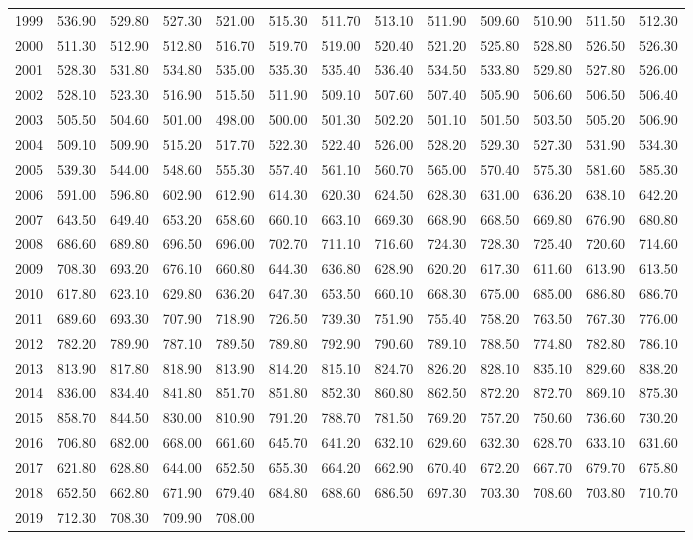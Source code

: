 \begin{longtable}{rrrrrrrrrrrrr}
  1999 & 536.90 & 529.80 & 527.30 & 521.00 & 515.30 & 511.70 & 513.10 & 511.90 & 509.60 & 510.90 & 511.50 & 512.30 \\ 
  2000 & 511.30 & 512.90 & 512.80 & 516.70 & 519.70 & 519.00 & 520.40 & 521.20 & 525.80 & 528.80 & 526.50 & 526.30 \\ 
  2001 & 528.30 & 531.80 & 534.80 & 535.00 & 535.30 & 535.40 & 536.40 & 534.50 & 533.80 & 529.80 & 527.80 & 526.00 \\ 
  2002 & 528.10 & 523.30 & 516.90 & 515.50 & 511.90 & 509.10 & 507.60 & 507.40 & 505.90 & 506.60 & 506.50 & 506.40 \\ 
  2003 & 505.50 & 504.60 & 501.00 & 498.00 & 500.00 & 501.30 & 502.20 & 501.10 & 501.50 & 503.50 & 505.20 & 506.90 \\ 
  2004 & 509.10 & 509.90 & 515.20 & 517.70 & 522.30 & 522.40 & 526.00 & 528.20 & 529.30 & 527.30 & 531.90 & 534.30 \\ 
  2005 & 539.30 & 544.00 & 548.60 & 555.30 & 557.40 & 561.10 & 560.70 & 565.00 & 570.40 & 575.30 & 581.60 & 585.30 \\ 
  2006 & 591.00 & 596.80 & 602.90 & 612.90 & 614.30 & 620.30 & 624.50 & 628.30 & 631.00 & 636.20 & 638.10 & 642.20 \\ 
  2007 & 643.50 & 649.40 & 653.20 & 658.60 & 660.10 & 663.10 & 669.30 & 668.90 & 668.50 & 669.80 & 676.90 & 680.80 \\ 
  2008 & 686.60 & 689.80 & 696.50 & 696.00 & 702.70 & 711.10 & 716.60 & 724.30 & 728.30 & 725.40 & 720.60 & 714.60 \\ 
  2009 & 708.30 & 693.20 & 676.10 & 660.80 & 644.30 & 636.80 & 628.90 & 620.20 & 617.30 & 611.60 & 613.90 & 613.50 \\ 
  2010 & 617.80 & 623.10 & 629.80 & 636.20 & 647.30 & 653.50 & 660.10 & 668.30 & 675.00 & 685.00 & 686.80 & 686.70 \\ 
  2011 & 689.60 & 693.30 & 707.90 & 718.90 & 726.50 & 739.30 & 751.90 & 755.40 & 758.20 & 763.50 & 767.30 & 776.00 \\ 
  2012 & 782.20 & 789.90 & 787.10 & 789.50 & 789.80 & 792.90 & 790.60 & 789.10 & 788.50 & 774.80 & 782.80 & 786.10 \\ 
  2013 & 813.90 & 817.80 & 818.90 & 813.90 & 814.20 & 815.10 & 824.70 & 826.20 & 828.10 & 835.10 & 829.60 & 838.20 \\ 
  2014 & 836.00 & 834.40 & 841.80 & 851.70 & 851.80 & 852.30 & 860.80 & 862.50 & 872.20 & 872.70 & 869.10 & 875.30 \\ 
  2015 & 858.70 & 844.50 & 830.00 & 810.90 & 791.20 & 788.70 & 781.50 & 769.20 & 757.20 & 750.60 & 736.60 & 730.20 \\ 
  2016 & 706.80 & 682.00 & 668.00 & 661.60 & 645.70 & 641.20 & 632.10 & 629.60 & 632.30 & 628.70 & 633.10 & 631.60 \\ 
  2017 & 621.80 & 628.80 & 644.00 & 652.50 & 655.30 & 664.20 & 662.90 & 670.40 & 672.20 & 667.70 & 679.70 & 675.80 \\ 
  2018 & 652.50 & 662.80 & 671.90 & 679.40 & 684.80 & 688.60 & 686.50 & 697.30 & 703.30 & 708.60 & 703.80 & 710.70 \\ 
  2019 & 712.30 & 708.30 & 709.90 & 708.00 &  &  &  &  &  &  &  &  \\ 
   \hline
\hline
\end{longtable}
